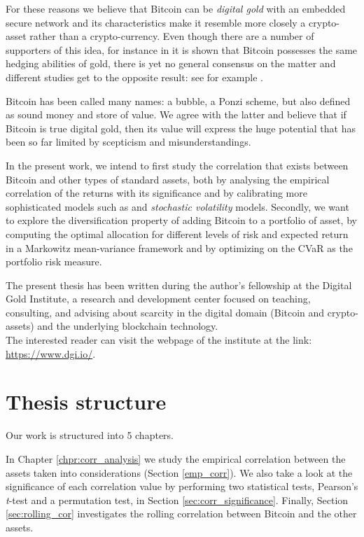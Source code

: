 \bigskip
For these reasons we believe that Bitcoin can be  \textit{digital gold} with an embedded secure network and its characteristics make it resemble more closely a crypto-asset rather than a crypto-currency.
Even though there are a number of supporters of this idea, for instance in \citep{DYHRBERG2016} it is shown that Bitcoin possesses the same hedging abilities of gold, there is yet no general consensus on the matter and different studies get to the opposite result: see for example \citep{KLEIN2018}.

Bitcoin has been called many names: a bubble, a Ponzi scheme, but also defined as sound money and store of value. We agree with the latter and believe that if Bitcoin is  true digital gold, then its value will express the huge potential that has been so far limited by scepticism and misunderstandings.

\bigskip

In the present work, we intend to first study the correlation that exists between Bitcoin and other types of standard assets, both by analysing the empirical correlation of the returns with its significance and by calibrating more sophisticated models such as  and \textit{stochastic volatility} models.
Secondly, we want to explore the diversification property of adding Bitcoin to a portfolio of asset, by computing the optimal allocation for different levels of risk and expected return in a Markowitz mean-variance framework and by optimizing on the CVaR as the portfolio risk measure.


\bigskip
\noindent
The present thesis has been written during the author's fellowship at the Digital Gold Institute, a research and development center focused on teaching, consulting, and advising about scarcity in the digital domain (Bitcoin and crypto-assets) and the underlying blockchain technology. \\
The interested reader can visit the webpage of the institute at the link: \href{https://www.dgi.io/}{https://www.dgi.io/}.

\bigskip

\section{Thesis structure}
Our work is structured into 5 chapters.

\bigskip
\noindent
In Chapter \ref{chpr:corr_analysis} we study the empirical correlation between the assets taken into considerations (Section \ref{emp_corr}). We also take a look at the significance of each correlation value by performing two statistical tests, Pearson's \textit{t}-test and a permutation test, in Section \ref{sec:corr_significance}. Finally, Section \ref{sec:rolling_cor} investigates the rolling correlation between Bitcoin and the other assets.

